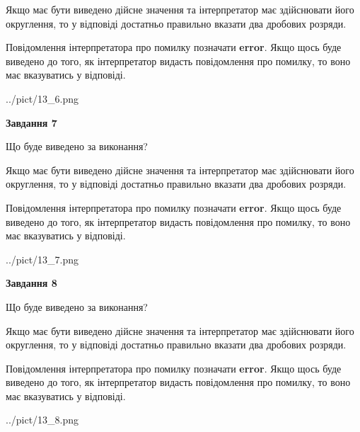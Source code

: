 \documentclass[12pt, ukrainian]{article}
\begin{document}
{\begin {Large}
Якщо має бути виведено дійсне значення та інтерпретатор має здійснювати його округлення, 
то у відповіді достатньо правильно вказати два дробових розряди.

Повідомлення інтерпретатора про помилку позначати \textbf{error}.
Якщо щось буде виведено до того, як інтерпретатор видасть повідомлення про помилку, 
то воно має вказуватись у відповіді. \par

\begin{center}
	{../pict/13_6.png}
\end{center}
\newpage

{\begin {center}\textbf{Завдання 7}\end {center}}\par
Що буде виведено за виконання? \par

Якщо має бути виведено дійсне значення та інтерпретатор має здійснювати його округлення, 
то у відповіді достатньо правильно вказати два дробових розряди.

Повідомлення інтерпретатора про помилку позначати \textbf{error}.
Якщо щось буде виведено до того, як інтерпретатор видасть повідомлення про помилку, 
то воно має вказуватись у відповіді. \par

\begin{center}
	{../pict/13_7.png}
\end{center}
\newpage

{\begin {center}\textbf{Завдання 8}\end {center}}\par
Що буде виведено за виконання? \par

Якщо має бути виведено дійсне значення та інтерпретатор має здійснювати його округлення, 
то у відповіді достатньо правильно вказати два дробових розряди.

Повідомлення інтерпретатора про помилку позначати \textbf{error}.
Якщо щось буде виведено до того, як інтерпретатор видасть повідомлення про помилку, 
то воно має вказуватись у відповіді. \par

\begin{center}
	{../pict/13_8.png}
\end{center}
\newpage


\end{Large}}
\end{document}
